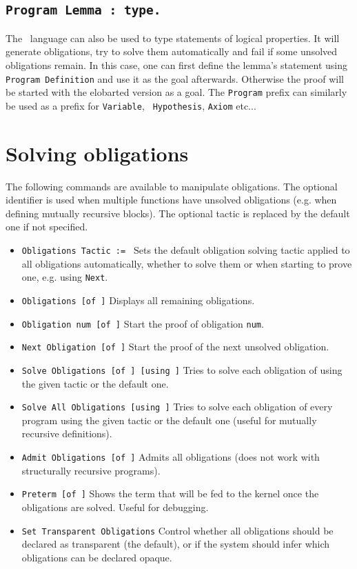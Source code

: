 \subsection{\tt Program Lemma {\ident} : type.
  \label{ProgramLemma}}

The \Russell\ language can also be used to type statements of logical
properties. It will generate obligations, try to solve them
automatically and fail if some unsolved obligations remain. 
In this case, one can first define the lemma's
statement using {\tt Program Definition} and use it as the goal afterwards.
Otherwise the proof will be started with the elobarted version as a goal.
The {\tt Program} prefix can similarly be used as a prefix for {\tt Variable}, {\tt
  Hypothesis}, {\tt Axiom} etc...

\section{Solving obligations}
The following commands are available to manipulate obligations. The
optional identifier is used when multiple functions have unsolved
obligations (e.g. when defining mutually recursive blocks). The optional
tactic is replaced by the default one if not specified.

\begin{itemize}
\item {\tt Obligations Tactic := \tacexpr}
  Sets the default obligation
  solving tactic applied to all obligations automatically, whether to
  solve them or when starting to prove one, e.g. using {\tt Next}.
\item {\tt Obligations [of \ident]} Displays all remaining
  obligations.
\item {\tt Obligation num [of \ident]} Start the proof of
  obligation {\tt num}.
\item {\tt Next Obligation [of \ident]} Start the proof of the next
  unsolved obligation.
\item {\tt Solve Obligations [of \ident] [using
    \tacexpr]}
  Tries to solve
  each obligation of \ident using the given tactic or the default one.
\item {\tt Solve All Obligations [using \tacexpr]} Tries to solve
  each obligation of every program using the given tactic or the default
  one (useful for mutually recursive definitions).
\item {\tt Admit Obligations [of \ident]} 
  Admits all obligations (does not work with structurally recursive programs).
\item {\tt Preterm [of \ident]} 
  Shows the term that will be fed to
  the kernel once the obligations are solved. Useful for debugging.
\item {\tt Set Transparent Obligations}
  Control whether all obligations should be declared as transparent (the
  default), or if the system should infer which obligations can be declared opaque. 
\end{itemize}

